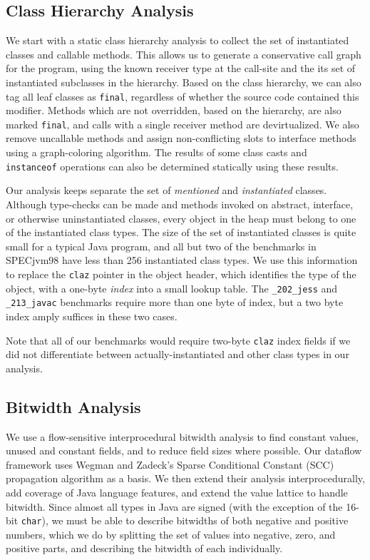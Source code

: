 \documentclass{acmconf}
\begin{document}
\subsection{Class Hierarchy Analysis}
We start with a static class hierarchy analysis to collect the set of
instantiated classes and callable methods.  This allows us to generate
a conservative call graph for the program, using the known receiver
type at the call-site and the its set of instantiated subclasses in the
hierarchy.  Based on the class hierarchy, we can also tag all leaf
classes as {\tt final}, regardless of whether the source code contained
this modifier.  Methods which are not overridden, based on
the hierarchy, are also marked {\tt final}, and calls with a single
receiver method are devirtualized.  We also remove uncallable methods
and assign non-conflicting slots to interface methods using a
graph-coloring algorithm.  The results of some class casts and {\tt
  instanceof} operations can also be determined statically using
these results.

Our analysis keeps separate the set of {\it mentioned} and
{\it instantiated} classes.  Although type-checks can be made and methods
invoked on abstract, interface, or otherwise uninstantiated classes,
every object
in the heap must belong to one of the instantiated class types.
The size of the set of instantiated classes is quite small for a
typical Java program, and all but two of the benchmarks in SPECjvm98
have less than 256 instantiated class types.  We use this information
to replace the {\tt claz} pointer in the object header, which
identifies the type of the object, with a one-byte {\it index} into a
small lookup table.  The {\tt \_202\_jess} and {\tt \_213\_javac}
benchmarks require more than one byte of index, but a two byte index
amply suffices in these two cases.

Note that all of our benchmarks would require two-byte {\tt claz}
index fields if we did not differentiate between actually-instantiated
and other class types in our analysis.


\subsection{Bitwidth Analysis}
We use a flow-sensitive interprocedural bitwidth analysis to
find constant values, unused and constant fields, and to reduce
field sizes where possible.  Our dataflow framework uses
Wegman and Zadeck's Sparse Conditional Constant (SCC) propagation
algorithm \cite{wegman91:scc} as a basis.  We then extend their
analysis interprocedurally, add coverage of Java language features,
and extend the value lattice to handle bitwidth.
Since almost all types in Java are signed (with the exception of the
16-bit {\tt char}), we must be able to describe bitwidths of both
negative and positive numbers, which we do by splitting the set of
values into negative, zero, and positive parts, and describing the
bitwidth of each individually.
\end{document}
